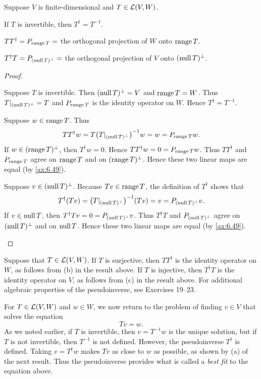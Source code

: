 \begin{result}\label{ax:6.69}
Suppose $V$ is finite-dimensional and $T\in\mathcal{L}(V,W)$.
\begin{parts}
\item If $T$ is invertible, then $T^\dagger=T^{-1}$.
\item $TT^\dagger=P_{\operatorname{range} T}=$ the orthogonal projection of $W$ onto
  $\operatorname{range} T$.
\item $T^\dagger T=P_{(\operatorname{null} T)^\perp}=$ the orthogonal projection of $V$ onto
  $(\operatorname{null} T)^\perp$.
\end{parts}
\end{result}

\begin{proof}\leavevmode
\begin{parts}
\item Suppose $T$ is invertible. Then $(\operatorname{null} T)^\perp=V$ and $\operatorname{range} T=W$.
  Thus $T|_{(\operatorname{null} T)^\perp}=T$ and $P_{\operatorname{range} T}$ is the identity operator on
  $W$. Hence $T^\dagger=T^{-1}$.
\item Suppose $w\in\operatorname{range} T$. Thus
  \[ TT^\dagger w = T\bigl(T|_{(\operatorname{null} T)^\perp}\bigr)^{-1}w = w
     = P_{\operatorname{range} T}w. \]
  If $w\in(\operatorname{range} T)^\perp$, then $T^\dagger w=0$. Hence
  $TT^\dagger w=0=P_{\operatorname{range} T}w$. Thus $TT^\dagger$ and $P_{\operatorname{range} T}$ agree on
  $\operatorname{range} T$ and on $(\operatorname{range} T)^\perp$. Hence these two linear maps are equal
  (by \ref{ax:6.49}).
\item Suppose $v\in(\operatorname{null} T)^\perp$. Because $Tv\in\operatorname{range} T$, the definition of
  $T^\dagger$ shows that
  \[ T^\dagger(Tv) = \bigl(T|_{(\operatorname{null} T)^\perp}\bigr)^{-1}(Tv) = v
     = P_{(\operatorname{null} T)^\perp}v. \]
  If $v\in\operatorname{null} T$, then $T^\dagger Tv=0=P_{(\operatorname{null} T)^\perp}v$. Thus
  $T^\dagger T$ and $P_{(\operatorname{null} T)^\perp}$ agree on $(\operatorname{null} T)^\perp$ and on
  $\operatorname{null} T$. Hence these two linear maps are equal (by \ref{ax:6.49}).
  \qedhere
\end{parts}
\end{proof}

%
Suppose that $T\in\mathcal{L}(V,W)$. If $T$ is surjective, then $TT^\dagger$ is the
identity operator on $W$, as follows from (b) in the result above. If $T$ is
injective, then $T^\dagger T$ is the identity operator on $V$, as follows from
(c) in the result above. For additional algebraic properties of the
pseudoinverse, see Exercises 19--23.

For $T\in\mathcal{L}(V,W)$ and $w\in W$, we now return to the problem of finding
$v\in V$ that solves the equation
\[ Tv = w. \]
As we noted earlier, if $T$ is invertible, then $v=T^{-1}w$ is the unique
solution, but if $T$ is not invertible, then $T^{-1}$ is not defined. However,
the pseudoinverse $T^\dagger$ is defined. Taking $v=T^\dagger w$ makes $Tv$ as
close to $w$ as possible, as shown by (a) of the next result. Thus the
pseudoinverse provides what is called a \emph{best fit} to the equation above.

